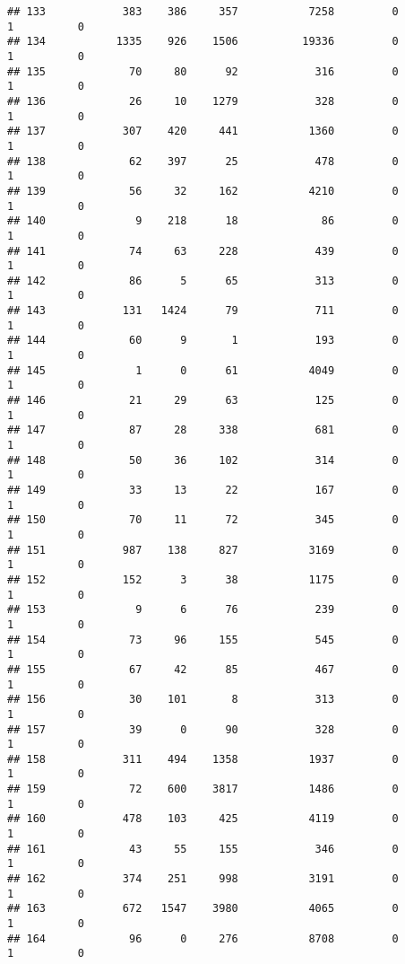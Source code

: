 \documentclass[
]{article}
\begin{document}
\begin{verbatim}
## 133            383    386     357           7258         0         1          0
## 134           1335    926    1506          19336         0         1          0
## 135             70     80      92            316         0         1          0
## 136             26     10    1279            328         0         1          0
## 137            307    420     441           1360         0         1          0
## 138             62    397      25            478         0         1          0
## 139             56     32     162           4210         0         1          0
## 140              9    218      18             86         0         1          0
## 141             74     63     228            439         0         1          0
## 142             86      5      65            313         0         1          0
## 143            131   1424      79            711         0         1          0
## 144             60      9       1            193         0         1          0
## 145              1      0      61           4049         0         1          0
## 146             21     29      63            125         0         1          0
## 147             87     28     338            681         0         1          0
## 148             50     36     102            314         0         1          0
## 149             33     13      22            167         0         1          0
## 150             70     11      72            345         0         1          0
## 151            987    138     827           3169         0         1          0
## 152            152      3      38           1175         0         1          0
## 153              9      6      76            239         0         1          0
## 154             73     96     155            545         0         1          0
## 155             67     42      85            467         0         1          0
## 156             30    101       8            313         0         1          0
## 157             39      0      90            328         0         1          0
## 158            311    494    1358           1937         0         1          0
## 159             72    600    3817           1486         0         1          0
## 160            478    103     425           4119         0         1          0
## 161             43     55     155            346         0         1          0
## 162            374    251     998           3191         0         1          0
## 163            672   1547    3980           4065         0         1          0
## 164             96      0     276           8708         0         1          0

\end{verbatim}
\end{document}
